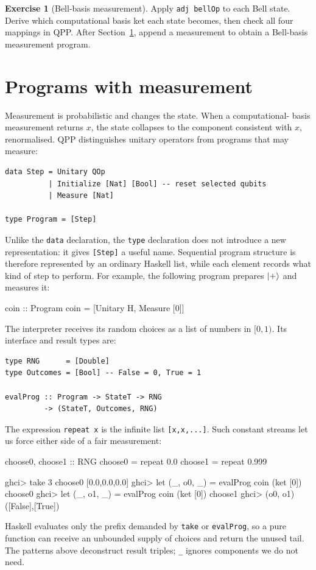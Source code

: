 \documentclass[11pt,a4paper]{article}
\theoremstyle{definition}
\newtheorem{exercise}{Exercise}[section]
\begin{document}
\begin{exercise}[Bell-basis measurement]
Apply \lstinline|adj bellOp| to each Bell state.  Derive which computational
basis ket each state becomes, then check all four mappings in QPP.  After
Section~\ref{sec:measurement}, append a measurement to obtain a Bell-basis
measurement program.
\end{exercise}

\section{Programs with measurement}
\label{sec:measurement}

Measurement is probabilistic and changes the state.  When a computational-
basis measurement returns $x$, the state collapses to the component
consistent with $x$, renormalised.  QPP distinguishes unitary operators from
programs that may measure:
\begin{lstlisting}
data Step = Unitary QOp
          | Initialize [Nat] [Bool] -- reset selected qubits
          | Measure [Nat]

type Program = [Step]
\end{lstlisting}
Unlike the \lstinline|data| declaration, the \lstinline|type| declaration
does not introduce a new representation: it gives \lstinline|[Step]| a useful
name.  Sequential program structure is therefore represented by an ordinary
Haskell list, while each element records what kind of step to perform.
For example, the following program prepares $\left| + \right\rangle$ and measures it:
\begin{qppcode}
coin :: Program
coin = [Unitary H, Measure [0]]
\end{qppcode}

The interpreter receives its random choices as a list of numbers in $[0,1)$.
Its interface and result types are:
\begin{lstlisting}
type RNG      = [Double]
type Outcomes = [Bool] -- False = 0, True = 1

evalProg :: Program -> StateT -> RNG
         -> (StateT, Outcomes, RNG)
\end{lstlisting}
The expression \lstinline|repeat x| is the infinite list
\lstinline|[x,x,...]|.  Such constant streams let us force either side of a
fair measurement:
\begin{qppcode}
choose0, choose1 :: RNG
choose0 = repeat 0.0
choose1 = repeat 0.999

ghci> take 3 choose0
[0.0,0.0,0.0]
ghci> let (_, o0, _) = evalProg coin (ket [0]) choose0
ghci> let (_, o1, _) = evalProg coin (ket [0]) choose1
ghci> (o0, o1)
([False],[True])
\end{qppcode}
Haskell evaluates only the prefix demanded by \lstinline|take| or
\lstinline|evalProg|, so a
pure function can receive an unbounded supply of choices and return the unused
tail.  The patterns above deconstruct result triples; \lstinline|_| ignores
components we do not need.
\end{document}
